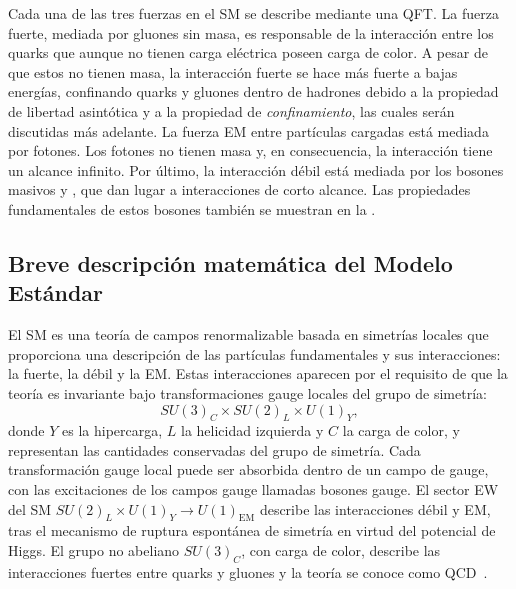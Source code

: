 Cada una de las tres fuerzas en el \ac{SM} se describe mediante una \ac{QFT}.
La fuerza fuerte, mediada por gluones sin masa, es responsable de la interacción entre los quarks que aunque no tienen carga eléctrica poseen carga de color. A pesar de que estos no tienen masa, la interacción fuerte se hace más fuerte a bajas energías, confinando quarks y gluones dentro de hadrones debido a la propiedad de libertad asintótica y a la propiedad de \textit{confinamiento}, las cuales serán discutidas más adelante.
La fuerza \ac{EM} entre partículas cargadas está mediada por fotones. Los fotones no tienen masa y, en consecuencia, la interacción tiene un alcance infinito.
Por último, la interacción débil está mediada por los bosones masivos \Wboson y \Zboson, que dan lugar a interacciones de corto alcance. Las propiedades fundamentales de estos bosones también se muestran en la \Fig{\ref{fig:theory:sm:particles_interaction:particles}}.









\subsection{Breve descripción matemática del Modelo Estándar}
\label{subsec:theory:sm:mathematical}

El \ac{SM} es una teoría de campos renormalizable basada en simetrías locales que proporciona una descripción de las partículas fundamentales y sus interacciones: la fuerte, la débil y la \ac{EM}. Estas interacciones aparecen por el requisito de que la teoría es invariante bajo transformaciones gauge locales del grupo de simetría:
\begin{equation*}
    SU(3)_{C} \times SU(2)_{L} \times U(1)_{Y},
\end{equation*}
donde \(Y\) es la hipercarga, \(L\) la helicidad izquierda y \(C\) la carga de color, y representan las cantidades conservadas del grupo de simetría. Cada transformación gauge local puede ser absorbida dentro de un campo de gauge, con las excitaciones de los campos gauge llamadas bosones gauge. El sector \ac{EW} del \ac{SM} \(SU(2)_{L} \times U(1)_{Y} \to U(1)_{\text{EM}}\) describe las interacciones débil y \ac{EM}, tras el mecanismo de ruptura espontánea de simetría en virtud del potencial de Higgs. El grupo no abeliano \(SU(3)_C\), con carga de color, describe las interacciones fuertes entre quarks y gluones y la teoría se conoce como \ac{QCD}~\cite{Ellis-1996-book}.


